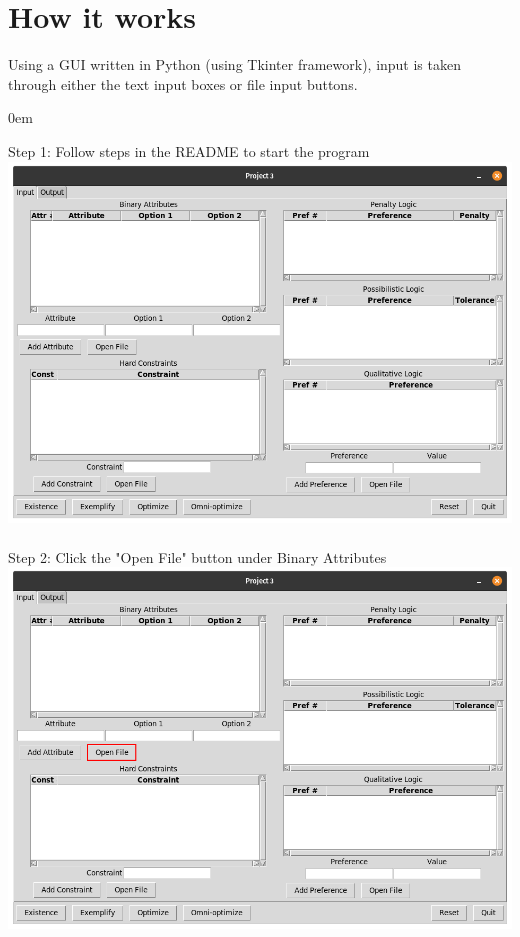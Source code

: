 \documentclass[11pt]{article}
\begin{document}
\section{How it works}
Using a GUI written in Python (using Tkinter framework), input is taken through either the text input boxes or file input buttons.
\begin{description}
\addtolength{\itemindent}{0.80cm}
\itemsep0em
\item[Binary Attributes] Step 1: Follow steps in the README to start the program\\
\includegraphics[scale=0.3]{input_start} \\\\
Step 2: Click the "Open File" button under Binary Attributes\\
\includegraphics[scale=0.3]{input_attributes}\\

\end{description}
\end{document}
